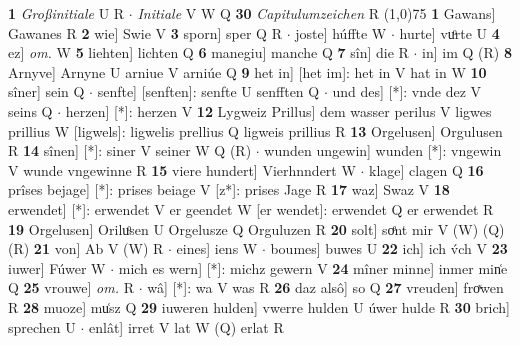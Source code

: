 \documentclass[8pt,a4paper,notitlepage]{article}
\begin{document}
\begin{table}[ht]
\begin{minipage}[t]{0.5\linewidth}
\textbf{1} \textit{Großinitiale} U R   $\cdot$ \textit{Initiale} V W Q  \textbf{30} \textit{Capitulumzeichen} R  \newline
\line(1,0){75} \newline
\textbf{1} Gawans] Gawanes R \textbf{2} wie] Swie V \textbf{3} sporn] sper Q R  $\cdot$ joste] húffte W  $\cdot$ hurte] vuͦrte U \textbf{4} ez] \textit{om.} W \textbf{5} liehten] lichten Q \textbf{6} manegiu] manche Q \textbf{7} sîn] die R  $\cdot$ in] im Q (R) \textbf{8} Arnyve] Arnyne U arniue V arniúe Q \textbf{9} het in] [het im]: het in V hat in W \textbf{10} sîner] sein Q  $\cdot$ senfte] [senften]: senfte U senfften Q  $\cdot$ und des] [*]: vnde dez V seins Q  $\cdot$ herzen] [*]: herzen V \textbf{12} Lygweiz Prillus] dem wasser perilus V ligwes prillius W [ligwels]: ligwelis prellius Q ligweis prillius R \textbf{13} Orgelusen] Orgulusen R \textbf{14} sînen] [*]: siner V seiner W Q (R)  $\cdot$ wunden ungewin] wunden [*]: vngewin V wunde vngewinne R \textbf{15} viere hundert] Vierhnndert W  $\cdot$ klage] clagen Q \textbf{16} prîses bejage] [*]: prises beiage V [z*]: prises Jage R \textbf{17} waz] Swaz V \textbf{18} erwendet] [*]: erwendet V er geendet W [er wendet]: erwendet Q er erwendet R \textbf{19} Orgelusen] Oriluͦsen U Orgelusze Q Orguluzen R \textbf{20} solt] soͤnt mir V (W) (Q) (R) \textbf{21} von] Ab V (W) R  $\cdot$ eines] iens W  $\cdot$ boumes] buwes U \textbf{22} ich] ich v́ch V \textbf{23} iuwer] Fúwer W  $\cdot$ mich es wern] [*]: michz gewern V \textbf{24} mîner minne] inmer min͑e Q \textbf{25} vrouwe] \textit{om.} R  $\cdot$ wâ] [*]: wa V was R \textbf{26} daz alsô] so Q \textbf{27} vreuden] froͯwen R \textbf{28} muoze] mu͑sz Q \textbf{29} iuweren hulden] vwerre hulden U úwer hulde R \textbf{30} brich] sprechen U  $\cdot$ enlât] irret V lat W (Q) erlat R \newline
\end{minipage}
\end{table}
\end{document}
